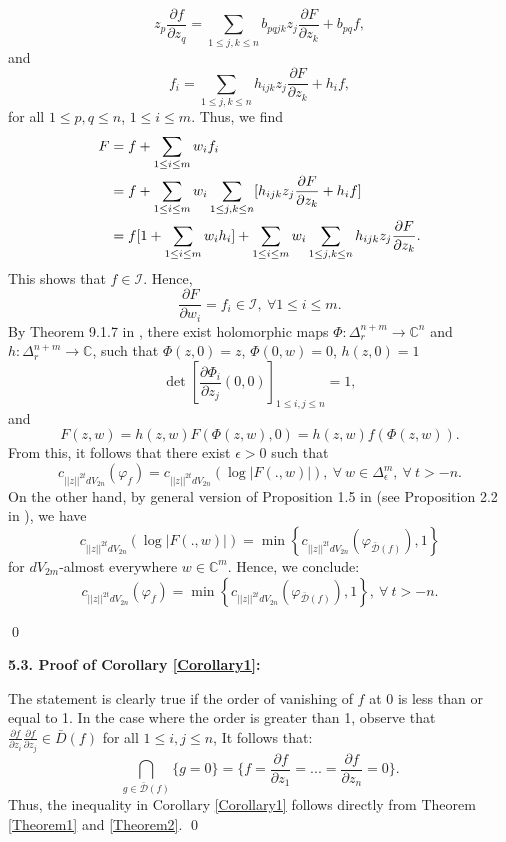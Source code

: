 \documentclass[a4paper,oneside,reqno,11pt]{article}
\begin{document}
$$z_p \frac { \partial f} { \partial z_q} = \sum\limits_{ 1 \leq j,k \leq n } b_{ pqjk } z_j \frac { \partial F } { \partial z_k } + b_{ pq } f,$$ and 
$$f_i = \sum\limits_{ 1 \leq j,k \leq n } h_{ ijk } z_j \frac { \partial F } { \partial z_k } + h_{ i } f,$$ 
for all $1\leq p,q \leq n$, $1\leq i\leq m$. Thus, we find 
$$\aligned F &= f + \sum\limits_{ 1\leq i\leq m } w_i f_i\\ 
&= f + \sum\limits_{ 1\leq i\leq m } w_i \sum\limits_{ 1 \leq j,k \leq n } [h_{ ijk } z_j \frac { \partial F } { \partial z_k } + h_{ i } f]\\ 
&=f [ 1 + \sum\limits_{ 1 \leq i\leq m } w_i h_{ i } ] + \sum\limits_{ 1\leq i\leq m } w_i \sum\limits_{ 1 \leq j,k \leq n } h_{ ijk } z_j \frac { \partial F } { \partial z_k }. \endaligned$$ 
This shows that $f\in \mathcal I$. Hence, 
$$\frac { \partial F } { \partial w_{ i } } = f_i\in\mathcal I,\ \forall 1\leq i\leq m.$$ 
By Theorem 9.1.7 in \cite{JP00}, there exist holomorphic maps $\Phi : \Delta_r^{ n + m }\to \mathbb C^n$ and $h: \Delta_r^{ n + m }\to \mathbb C$, such that $\Phi ( z , 0 ) = z $, $\Phi ( 0 , w ) = 0$, $h ( z , 0 ) = 1$ 
$$\det [ \frac { \partial \Phi_i } { \partial z_j } (0,0) ]_{ 1\leq i, j\leq n } = 1,$$
and
$$F ( z , w ) = h ( z ,w ) F ( \Phi ( z , w ) , 0 ) = h ( z ,w ) f ( \Phi ( z , w ) ).$$
From this, it follows that there exist $\epsilon > 0$ such that
$$c_{ ||z||^{ 2t } dV_{ 2n } } ( \varphi_{ f } ) = c_{ ||z||^{ 2t } dV_{ 2n } } ( \log | F ( . , w ) | ),\ \forall\ w\in \Delta_{ \epsilon }^{ m },\ \forall\ t > -n.$$
On the other hand, by general version of Proposition 1.5 in \cite{DK01} (see Proposition 2.2 in \cite{HHT21}), we have
$$c_{ ||z||^{ 2t } dV_{ 2n } } ( \log | F ( . , w )| ) = \min \left\{ c_{ ||z||^{ 2t } dV_{ 2n } } (  \varphi_{ \bar{ \mathcal {D} } ( f ) } ) , 1 \right\}$$
for $dV_{ 2m }$-almost everywhere $w\in\mathbb C^{ m }$. Hence, we conclude:
$$c_{ ||z||^{ 2t } dV_{ 2n } } ( \varphi_{ f }) = \min \left\{ c_{ ||z||^{ 2t } dV_{ 2n } } ( \varphi_{ \bar{ \mathcal {D} } ( f ) } ) , 1  \right\},\ \forall\ t > -n.$$

\qed

{\bf 5.3. Proof of Corollary \ref{Corollary1}:}

The statement is clearly true if the order of vanishing of $f$ at $0$ is less than or equal to 1. In the case where the order is greater than 1, observe that $\frac { \partial f } { \partial z_i }\frac { \partial f } { \partial z_j }\in \bar D ( f )$ for all $1\leq i, j\leq n$, It follows that:
$$\bigcap\limits_{ g \in \bar { \mathcal  D } ( f )  } \{ g = 0 \} = \{f = \frac { \partial f } { \partial z_1 } = ... = \frac { \partial f } { \partial z_n }= 0\}.$$ 
Thus, the inequality in Corollary \ref{Corollary1} follows directly from Theorem \ref{Theorem1} and  \ref{Theorem2}.
\qed
\end{document}
